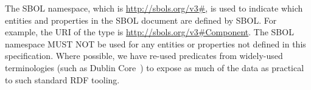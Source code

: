 The SBOL namespace, which is \url{http://sbols.org/v3\#}, is used to indicate which entities and properties in the SBOL document are defined by SBOL. For example, the URI of the type  is \url{http://sbols.org/v3\#Component}. The SBOL namespace MUST NOT be used for any entities or properties not defined in this specification.  Where possible, we have re-used predicates from widely-used terminologies (such as Dublin Core~\cite{dcmi2012}) to expose as much of the data as practical to such standard RDF tooling.

